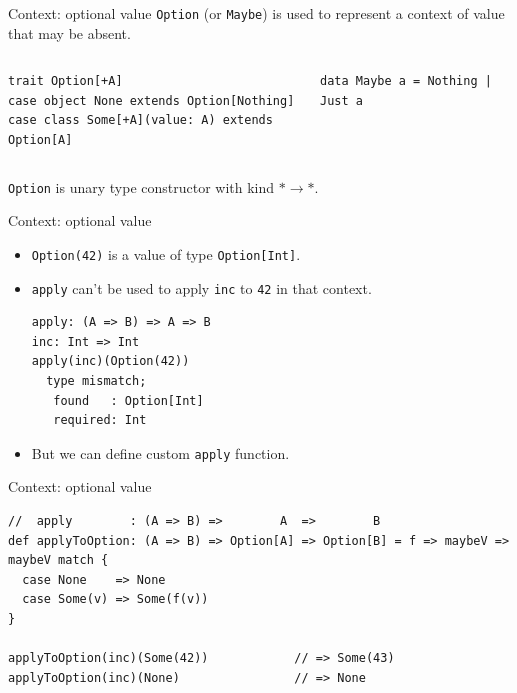 \documentclass[presentation,aspectratio=169,smaller]{beamer}
\begin{document}
\begin{frame}[label={sec:orgbf9092d},fragile]{Context: optional value}
 \texttt{Option} (or \texttt{Maybe}) is used to represent a context of value that may be
absent.

\begin{columns}
\begin{column}[t]{0.5\columnwidth}
\begin{verbatim}
trait Option[+A]
case object None extends Option[Nothing]
case class Some[+A](value: A) extends Option[A]
\end{verbatim}
\end{column}

\begin{column}[t]{0.5\columnwidth}
\begin{verbatim}
data Maybe a = Nothing | Just a
\end{verbatim}
\end{column}
\end{columns}

\texttt{Option} is unary type constructor with kind \(* \rightarrow *\).
\end{frame}

\begin{frame}[label={sec:orgc44ae8f},fragile]{Context: optional value}
 \begin{itemize}
\item \texttt{Option(42)} is a value of type \texttt{Option[Int]}.
\item \texttt{apply} can't be used to apply \texttt{inc} to \texttt{42} in that context.
\begin{verbatim}
apply: (A => B) => A => B
inc: Int => Int
apply(inc)(Option(42))
  type mismatch;
   found   : Option[Int]
   required: Int
\end{verbatim}
\item <2-> But we can define custom \texttt{apply} function.
\end{itemize}
\end{frame}

\begin{frame}[label={sec:org4178fe2},fragile]{Context: optional value}
 \begin{verbatim}
//  apply        : (A => B) =>        A  =>        B
def applyToOption: (A => B) => Option[A] => Option[B] = f => maybeV => maybeV match {
  case None    => None
  case Some(v) => Some(f(v))
}

applyToOption(inc)(Some(42))            // => Some(43)
applyToOption(inc)(None)                // => None
\end{verbatim}
\end{frame}
\end{document}
